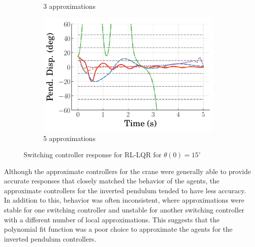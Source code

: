 \begin{figure}[tb]
\begin{subfigure}[b]{0.32\textwidth}
        \caption{3 approximations}
        \label{subfig_chap5:lumped_LQR_near_equil_15_3_bins_resp_unclipped}
    \end{subfigure}
    \hfill
    \begin{subfigure}[b]{0.32\textwidth}
        \centering
        \includegraphics[width=\textwidth]{figures/figures_Interpretability/Mean_ISE_Inverted_Pendulum-v0_cubic_5_bins_near_equil/Curve_fit_time_responses/lumped_lqr/curve_fit_Pend_Disp_15.pdf}
        \caption{5 approximations}
        \label{subfig_chap5:lumped_LQR_near_equil_15_5_bins_resp_unclipped}
    \end{subfigure}
    \caption{Switching controller response for RL-LQR for $\theta(0)=15^\circ$}
    \label{fig_chap5:lumped_LQR_near_equil_15_resp_unclipped}
\end{figure}
%

Although the approximate controllers for the crane were generally able to provide accurate responses that closely matched the behavior of the agents, the approximate controllers for the inverted pendulum tended to have less accuracy. In addition to this, behavior was often inconsistent, where approximations were stable for one switching controller and unstable for another switching controller with a different number of local approximations.
This suggests that the polynomial fit function was a poor choice to approximate the agents for the inverted pendulum controllers.



